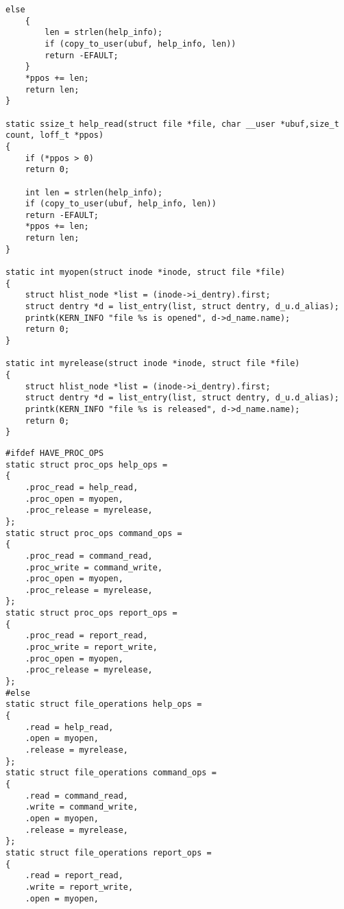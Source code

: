 \begin{center}
\begin{lstlisting}[label=listing_main_c7,caption=Файл main.c]
	else
	{
		len = strlen(help_info);
		if (copy_to_user(ubuf, help_info, len))
		return -EFAULT;
	}
	*ppos += len;
	return len;
}

static ssize_t help_read(struct file *file, char __user *ubuf,size_t count, loff_t *ppos) 
{
	if (*ppos > 0)
	return 0;
	
	int len = strlen(help_info);
	if (copy_to_user(ubuf, help_info, len))
	return -EFAULT;
	*ppos += len;
	return len;
}

static int myopen(struct inode *inode, struct file *file)
{
	struct hlist_node *list = (inode->i_dentry).first;
	struct dentry *d = list_entry(list, struct dentry, d_u.d_alias);
	printk(KERN_INFO "file %s is opened", d->d_name.name);
	return 0;
}

static int myrelease(struct inode *inode, struct file *file)
{
	struct hlist_node *list = (inode->i_dentry).first;
	struct dentry *d = list_entry(list, struct dentry, d_u.d_alias);
	printk(KERN_INFO "file %s is released", d->d_name.name);
	return 0;
}
	\end{lstlisting}
\end{center}

\begin{center}
\begin{lstlisting}[label=listing_main_c8,caption=Файл main.c]
#ifdef HAVE_PROC_OPS
static struct proc_ops help_ops = 
{
	.proc_read = help_read,
	.proc_open = myopen,
	.proc_release = myrelease,
};
static struct proc_ops command_ops = 
{
	.proc_read = command_read,
	.proc_write = command_write,
	.proc_open = myopen,
	.proc_release = myrelease,
};
static struct proc_ops report_ops = 
{
	.proc_read = report_read,
	.proc_write = report_write,
	.proc_open = myopen,
	.proc_release = myrelease,
};
#else
static struct file_operations help_ops =
{
	.read = help_read,
	.open = myopen,
	.release = myrelease,
};
static struct file_operations command_ops =
{
	.read = command_read,
	.write = command_write,
	.open = myopen,
	.release = myrelease,
};
static struct file_operations report_ops =
{
	.read = report_read,
	.write = report_write,
	.open = myopen,
	\end{lstlisting}
\end{center}

